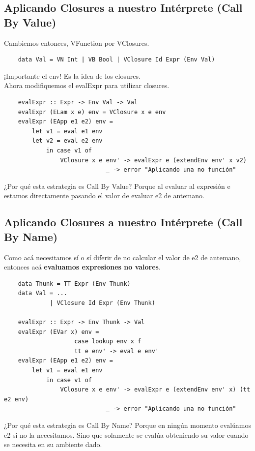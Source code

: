 \documentclass[10pt,a4paper]{article}
\begin{document}
\subsection*{Aplicando Closures a nuestro Intérprete (Call By Value)}
Cambiemos entonces, VFunction por VClosures. 
\begin{lstlisting}
    data Val = VN Int | VB Bool | VClosure Id Expr (Env Val)
\end{lstlisting}
¡Importante el env! Es la idea de los closures. \\
Ahora modifiquemos el evalExpr para utilizar closures. 
\begin{lstlisting}
    evalExpr :: Expr -> Env Val -> Val 
    evalExpr (ELam x e) env = VClosure x e env 
    evalExpr (EApp e1 e2) env = 
        let v1 = eval e1 env 
        let v2 = eval e2 env 
            in case v1 of 
                VClosure x e env' -> evalExpr e (extendEnv env' x v2)
                             _ -> error "Aplicando una no función"
\end{lstlisting}
¿Por qué esta estrategia es Call By Value? Porque al evaluar al expresión e estamos directamente pasando el valor de evaluar e2 de antemano.  
\subsection*{Aplicando Closures a nuestro Intérprete (Call By Name)}
Como acá necesitamos sí o sí diferir de no calcular el valor de e2 de antemano, entonces acá \textbf{evaluamos expresiones no valores}. 
\begin{lstlisting}
    data Thunk = TT Expr (Env Thunk)
    data Val = ...
             | VClosure Id Expr (Env Thunk) 

    evalExpr :: Expr -> Env Thunk -> Val     
    evalExpr (EVar x) env = 
                    case lookup env x f 
                    tt e env' -> eval e env' 
    evalExpr (EApp e1 e2) env = 
        let v1 = eval e1 env 
            in case v1 of 
                VClosure x e env' -> evalExpr e (extendEnv env' x) (tt e2 env)
                             _ -> error "Aplicando una no función"
\end{lstlisting}
¿Por qué esta estrategia es Call By Name? Porque en ningún momento evalúamos e2 si no la necesitamos. Sino que solamente se evalúa obteniendo su valor cuando se necesita en su ambiente dado.
\end{document}
